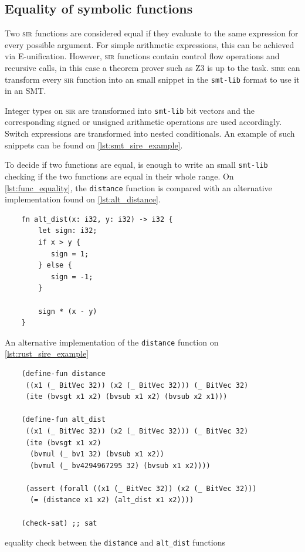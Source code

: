\subsection{Equality of symbolic functions}

Two \textsc{sir} functions are considered equal if they evaluate to the same
expression for every possible argument. For simple arithmetic expressions, this
can be achieved via E-unification. However, \textsc{sir} functions contain
control flow operations and recursive calls, in this case a theorem prover such
as Z3 is up to the task. \textsc{sire} can transform every \textsc{sir}
function into an small snippet in the \texttt{smt-lib} format to use it in an SMT.

Integer types on \textsc{sir} are transformed into \texttt{smt-lib} bit vectors
and the corresponding signed or unsigned arithmetic operations are used accordingly.
Switch expressions are transformed into nested conditionals. An example of such
snippets can be found on \ref{lst:smt_sire_example}. 

To decide if two functions are equal, is enough to write an small
\texttt{smt-lib} checking if the two functions are equal in their whole range. On \ref{lst:func_equality}, the \texttt{distance} function is compared with an alternative implementation found on \ref{lst:alt_distance}. 

\begin{listing}[ht]
    \begin{verbatim}
    fn alt_dist(x: i32, y: i32) -> i32 {
        let sign: i32; 
        if x > y {
           sign = 1;
        } else {
           sign = -1;
        }

        sign * (x - y)
    }
    \end{verbatim}
    \caption{An alternative implementation of the \texttt{distance} function on \ref{lst:rust_sire_example}}
  \label{lst:alt_distance}
\end{listing}

\begin{listing}[ht]
    \begin{verbatim}
    (define-fun distance 
     ((x1 (_ BitVec 32)) (x2 (_ BitVec 32))) (_ BitVec 32) 
     (ite (bvsgt x1 x2) (bvsub x1 x2) (bvsub x2 x1)))

    (define-fun alt_dist 
     ((x1 (_ BitVec 32)) (x2 (_ BitVec 32))) (_ BitVec 32) 
     (ite (bvsgt x1 x2) 
      (bvmul (_ bv1 32) (bvsub x1 x2)) 
      (bvmul (_ bv4294967295 32) (bvsub x1 x2))))
     
     (assert (forall ((x1 (_ BitVec 32)) (x2 (_ BitVec 32))) 
      (= (distance x1 x2) (alt_dist x1 x2)))) 

    (check-sat) ;; sat
    \end{verbatim}
    \caption{equality check between the \texttt{distance} and \texttt{alt\_dist} functions}
  \label{lst:func_equality}
\end{listing}

